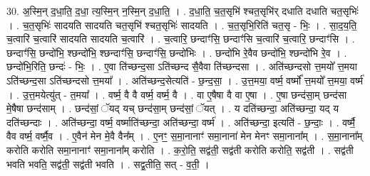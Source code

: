\documentclass[17pt]{extarticle}
\begin{document}
30. अ॒स्मि॒न् द॒धा॒ति॒ द॒धा॒ त्य॒स्मि॒न् न॒स्मि॒न् द॒धा॒ति॒ । . द॒धा॒ति॒ च॒त॒सृभि॑ श्चत॒सृभि॑र् दधाति दधाति चत॒सृभिः॑ । . च॒त॒सृभिः॑ सादयति सादयति चत॒सृभि॑ श्चत॒सृभिः॑ सादयति । . च॒त॒सृभि॒रिति॑ चत॒सृ - भिः॒ । . सा॒द॒य॒ति॒ च॒त्वारि॑ च॒त्वारि॑ सादयति सादयति च॒त्वारि॑ । . च॒त्वारि॒ छन्दाꣳ॑सि॒ छन्दाꣳ॑सि च॒त्वारि॑ च॒त्वारि॒ छन्दाꣳ॑सि । . छन्दाꣳ॑सि॒ छन्दो॑भि॒ श्छन्दो॑भि॒ श्छन्दाꣳ॑सि॒ छन्दाꣳ॑सि॒ छन्दो॑भिः । . छन्दो॑भि रे॒वैव छन्दो॑भि॒ श्छन्दो॑भि रे॒व । . छन्दो॑भि॒रिति॒ छन्दः॑ - भिः॒ । . ए॒वा ति॑च्छन्द॒सा ऽति॑च्छन्द सै॒वैवा ति॑च्छन्दसा । . अति॑च्छन्दसो त्त॒मयो᳚ त्त॒मया ऽति॑च्छन्द॒सा ऽति॑च्छन्दसो त्त॒मया᳚ । . अति॑च्छन्द॒सेत्यति॑ - छ॒न्द॒सा॒ । . उ॒त्त॒मया॒ वर्ष्म॒ वर्ष्मो᳚ त्त॒मयो᳚ त्त॒मया॒ वर्ष्म॑ । . उ॒त्त॒मयेत्यु॑त् - त॒मया᳚ । . वर्ष्म॒ वै वै वर्ष्म॒ वर्ष्म॒ वै । . वा ए॒षैषा वै वा ए॒षा । . ए॒षा छन्द॑सा॒म् छन्द॑सा मे॒षैषा छन्द॑साम् । . छन्द॑सां॒ ॅयद् यच् छन्द॑सा॒म् छन्द॑सां॒ ॅयत् । . य दति॑च्छन्दा॒ अति॑च्छन्दा॒ यद् य दति॑च्छन्दाः । . अति॑च्छन्दा॒ वर्ष्म॒ वर्ष्माति॑च्छन्दा॒ अति॑च्छन्दा॒ वर्ष्म॑ । . अति॑च्छन्दा॒ इत्यति॑ - छ॒न्दाः॒ । . वर्ष्मै॒ वैव वर्ष्म॒ वर्ष्मै॒व । . ए॒वैन॑ मेन मे॒वै वैन᳚म् । . ए॒नꣳ॒॒ स॒मा॒नानाꣳ॑ समा॒नाना॑ मेन मेनꣳ समा॒नाना᳚म् । . स॒मा॒नाना᳚म् करोति करोति समा॒नानाꣳ॑ समा॒नाना᳚म् करोति । . क॒रो॒ति॒ सद्व॑ती॒ सद्व॑ती करोति करोति॒ सद्व॑ती । . सद्व॑ती भवति भवति॒ सद्व॑ती॒ सद्व॑ती भवति । . सद्व॒तीति॒ सत् - व॒ती॒ । \newline
\end{document}
